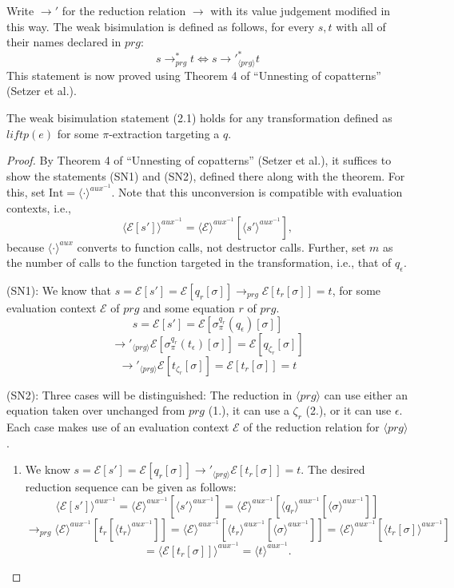 Write $\longrightarrow'$ for the reduction relation $\longrightarrow$ with its value judgement modified in this way. The weak bisimulation is defined as follows, for every $s,t$ with all of their names declared in $prg$:
\begin{equation}
s \longrightarrow_{prg}^* t \iff s {\longrightarrow'}_{\langle prg \rangle}^* t
\end{equation}
This statement is now proved using Theorem 4 of ``Unnesting of copatterns'' (Setzer et al.).

\begin{proposition}
The weak bisimulation statement (2.1) holds for any transformation defined as $liftp(e)$ for some $\pi$-extraction targeting a $q$.

\begin{proof}
By Theorem 4 of ``Unnesting of copatterns'' (Setzer et al.), it suffices to show the statements (SN1) and (SN2), defined there along with the theorem. For this, set $\textrm{Int} = \langle \cdot \rangle^{aux^{-1}}$. Note that this unconversion is compatible with evaluation contexts, i.e.,
\[
\langle \mathcal{E}[s'] \rangle^{aux^{-1}} = \langle \mathcal{E} \rangle^{aux^{-1}}[\langle s' \rangle^{aux^{-1}}],
\]
because $\langle \cdot \rangle^{aux}$ converts to function calls, not destructor calls.
Further, set $m$ as the number of calls to the function targeted in the transformation, i.e., that of $q_\epsilon$.

(SN1): We know that $s = \mathcal{E}[s'] = \mathcal{E}[q_r[\sigma]] \longrightarrow_{prg} \mathcal{E}[t_r[\sigma]] = t$, for some evaluation context $\mathcal{E}$ of $prg$ and some equation $r$ of $prg$.
\[
s = \mathcal{E}[s'] = \mathcal{E}[\sigma^{q_r}_\pi(q_\epsilon)[\sigma]]
\]
\[
\longrightarrow'_{\langle prg \rangle} \mathcal{E}[\sigma^{q_r}_\pi(t_\epsilon)[\sigma]] = \mathcal{E}[q_{\zeta_r}[\sigma]]
\]
\[
\longrightarrow'_{\langle prg \rangle} \mathcal{E}[t_{\zeta_r}[\sigma]] = \mathcal{E}[t_r[\sigma]] = t
\]

(SN2): Three cases will be distinguished: The reduction in $\langle prg \rangle$ can use either an equation taken over unchanged from $prg$ (1.), it can use a $\zeta_r$ (2.), or it can use $\epsilon$. Each case makes use of an evaluation context $\mathcal{E}$ of the reduction relation for $\langle prg \rangle$.
\begin{enumerate}
\item We know $s = \mathcal{E}[s'] = \mathcal{E}[q_r[\sigma]] \longrightarrow'_{\langle prg \rangle} \mathcal{E}[t_r[\sigma]] = t$. The desired reduction sequence can be given as follows:
\[
\langle \mathcal{E}[s'] \rangle^{aux^{-1}} = \langle \mathcal{E} \rangle^{aux^{-1}}[\langle s' \rangle^{aux^{-1}}] = \langle \mathcal{E} \rangle^{aux^{-1}}[\langle q_r \rangle^{aux^{-1}}[\langle \sigma \rangle^{aux^{-1}}]]
\]
\[
 \longrightarrow_{prg} \langle \mathcal{E} \rangle^{aux^{-1}}[t_r[\langle t_r \rangle^{aux^{-1}}]] = \langle \mathcal{E} \rangle^{aux^{-1}}[\langle t_r \rangle^{aux^{-1}}[\langle \sigma \rangle^{aux^{-1}}]] = \langle \mathcal{E} \rangle^{aux^{-1}}[\langle t_r[\sigma] \rangle^{aux^{-1}}]
\]
\[
= \langle \mathcal{E}[t_r[\sigma]] \rangle^{aux^{-1}} = \langle t \rangle^{aux^{-1}}.
\]


\end{enumerate}
\end{proof}
\end{proposition}
